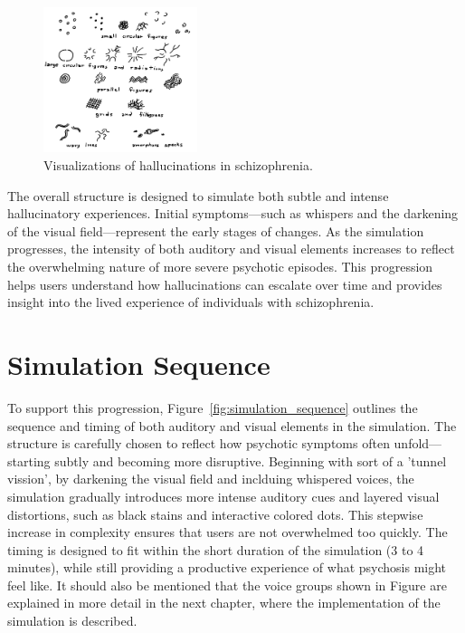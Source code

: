 \begin{figure}[h!] 
    \centering 
    \includegraphics[width=0.4\textwidth]{../../Figures/hallucinations-visual.jpg} 
    \caption{Visualizations of hallucinations in schizophrenia.} 
    \label{fig:visualizations_hallucinations} 
\end{figure}


The overall structure is designed to simulate both subtle and intense hallucinatory experiences. Initial symptoms—such as whispers and the darkening of the visual field—represent the early stages of changes. As the simulation progresses, the intensity of both auditory and visual elements increases to reflect the overwhelming nature of more severe psychotic episodes. This progression helps users understand how hallucinations can escalate over time and provides insight into the lived experience of individuals with schizophrenia.

\section{Simulation Sequence}

To support this progression, Figure~\ref{fig:simulation_sequence} outlines the sequence and timing of both auditory and visual elements in the simulation. The structure is carefully chosen to reflect how psychotic symptoms often unfold—starting subtly and becoming more disruptive. Beginning with sort of a 'tunnel vission', by darkening the visual field and inclduing whispered voices, the simulation gradually introduces more intense auditory cues and layered visual distortions, such as black stains and interactive colored dots. This stepwise increase in complexity ensures that users are not overwhelmed too quickly. The timing is designed to fit within the short duration of the simulation (3 to 4 minutes), while still providing a productive experience of what psychosis might feel like. It should also be mentioned that the voice groups shown in Figure are explained in more detail in the next chapter, where the implementation of the simulation is described.

